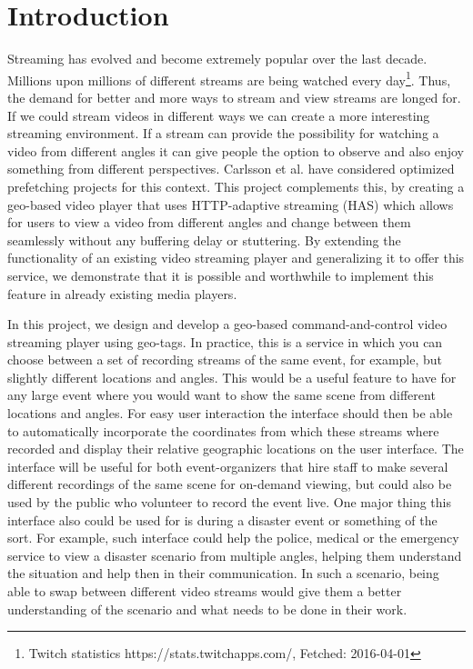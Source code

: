 \chapter{Introduction}
\label{cha:introduction}

Streaming has evolved and become extremely popular over the last decade. Millions upon millions of different streams are being watched every day\footnote{Twitch statistics https://stats.twitchapps.com/, Fetched: 2016-04-01}. Thus, the demand for better and more ways to stream and view streams are longed for. If we could stream videos in different ways we can create a more interesting streaming environment. If a stream can provide the possibility for watching a video from different angles it can give people the option to observe and also enjoy something from different perspectives. Carlsson et al.\cite{optimizedstreaming} have considered optimized prefetching projects for this context. This project complements this, by creating a geo-based video player that uses HTTP-adaptive streaming (HAS) which allows for users to view a video from different angles and change between them seamlessly without any buffering delay or stuttering. By extending the functionality of an existing video streaming player and generalizing it to offer this service, we demonstrate that it is possible and worthwhile to implement this feature in already existing media players.

In this project, we design and develop a geo-based command-and-control video streaming player using geo-tags. In practice, this is a service in which you can choose between a set of recording streams of the same event, for example, but slightly different locations and angles. This would be a useful feature to have for any large event where you would want to show the same scene from different locations and angles. For easy user interaction the interface should then be able to automatically incorporate the coordinates from which these streams where recorded and display their relative geographic locations on the user interface. The interface will be useful for both event-organizers that hire staff to make several different recordings of the same scene for on-demand viewing, but could also be used by the public who volunteer to record the event live. One major thing this interface also could be used for is during a disaster event or something of the sort. For example, such interface could help the police, medical or the emergency service to view a disaster scenario from multiple angles, helping them understand the situation and help then in their communication. In such a scenario, being able to swap between different video streams would give them a better understanding of the scenario and what needs to be done in their work.

